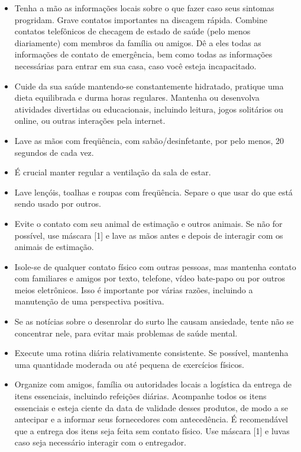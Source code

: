 \documentclass[onecolumn,journal]{IEEEtran}
\begin{document}
\begin{multicols}{2}
\begin{itemize}
\item  Tenha a mão as informações locais sobre o que fazer caso seus sintomas progridam. Grave contatos importantes na discagem rápida. Combine contatos telefônicos de checagem de estado de saúde (pelo menos diariamente) com membros da família ou amigos. Dê a eles todas as informações de contato de emergência, bem como todas as informações necessárias para entrar em sua casa, caso você esteja incapacitado.

\item Cuide da sua saúde mantendo-se constantemente hidratado, pratique uma dieta equilibrada e durma horas regulares. Mantenha ou desenvolva atividades divertidas ou educacionais, incluindo leitura, jogos solitários ou online, ou outras interações pela internet.

\item Lave as mãos com freqüência, com sabão/desinfetante, por pelo menos, 20 segundos de cada vez.

\item É crucial manter regular a ventilação da sala de estar.

\item Lave lençóis, toalhas e roupas com freqüência. Separe o que usar do que está sendo usado por outros.

\item Evite o contato com seu animal de estimação e outros animais. Se não for possível, use máscara [1] e lave as mãos antes e depois de interagir com os animais de estimação.

\item Isole-se de qualquer contato físico com outras pessoas, mas mantenha contato com familiares e amigos por texto, telefone, vídeo bate-papo ou por outros meios eletrônicos. Isso é importante por várias razões, incluindo a manutenção de uma perspectiva positiva.

\item Se as notícias sobre o desenrolar do surto lhe causam ansiedade, tente não se concentrar nele, para evitar mais problemas de saúde mental.

\item Execute uma rotina diária relativamente consistente. Se possível, mantenha uma quantidade moderada ou até pequena de exercícios físicos.

\item Organize com amigos, família ou autoridades locais a logística da entrega de itens essenciais, incluindo refeições diárias. Acompanhe todos os itens essenciais e esteja ciente da data de validade desses produtos, de modo a se antecipar e a informar seus fornecedores com antecedência. É recomendável que a entrega dos itens seja feita sem contato físico. Use máscara [1] e luvas caso seja necessário interagir com o entregador.


\end{itemize}
\end{multicols}
\end{document}
